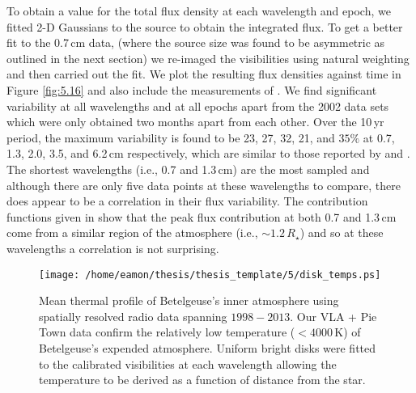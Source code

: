 To obtain a value for the total flux density at each wavelength and epoch, we fitted 2-D Gaussians to the source to obtain the integrated flux. To get a better fit to the 0.7\,cm data, (where the source size was found to be asymmetric as outlined in the next section) we re-imaged the visibilities using natural weighting and then carried out the fit. We plot the resulting flux densities against time in Figure \ref{fig:5.16} and also include the measurements of \cite{lim_1998}. We find significant variability at all wavelengths and at all epochs apart from the 2002 data sets which were only obtained two months apart from each other. Over the 10\,yr period, the maximum variability is found to be 23, 27, 32, 21, and $35\%$ at 0.7, 1.3, 2.0, 3.5, and 6.2\,cm respectively, which are similar to those reported by \cite{drake_1992} and \cite{bookbinder_1987}. The shortest wavelengths (i.e., 0.7 and 1.3\,cm) are the most sampled and although there are only five data points at these wavelengths to compare, there does appear to be a correlation in their flux variability. The contribution functions given in \cite{harper_2001} show that the peak flux contribution at both 0.7 and 1.3\,cm come from a similar region of the atmosphere (i.e., $\sim 1.2\,R_{\star}$) and so at these wavelengths a correlation is not surprising.

\begin{figure}[hbt!]
\centering
          \texttt{[image: /home/eamon/thesis/thesis\_template/5/disk\_temps.ps]}
\caption[Atmospheric temperature profile between $1998-2013$]{Mean thermal profile of Betelgeuse's inner atmosphere using spatially resolved radio data spanning $1998-2013$. Our VLA + Pie Town data confirm the relatively low temperature ($< 4000$\,K) of Betelgeuse's expended atmosphere. Uniform bright disks were fitted to the calibrated visibilities at each wavelength allowing the temperature to be derived as a function of distance from the star.}
\label{fig:5.16a}
\end{figure}

